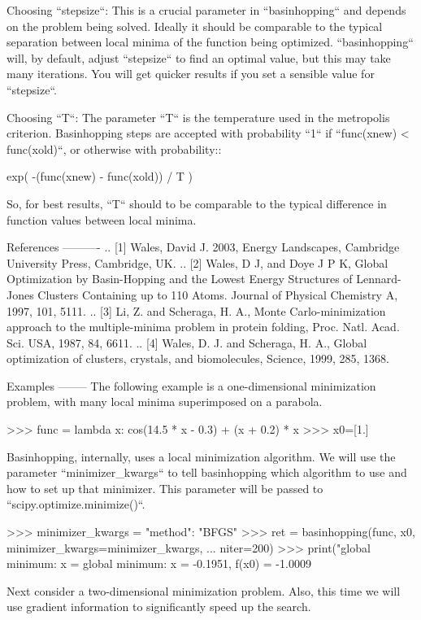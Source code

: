 \begin{DoxyVerb}
Choosing ``stepsize``:  This is a crucial parameter in ``basinhopping`` and
depends on the problem being solved.  Ideally it should be comparable to
the typical separation between local minima of the function being
optimized.  ``basinhopping`` will, by default, adjust ``stepsize`` to find
an optimal value, but this may take many iterations.  You will get quicker
results if you set a sensible value for ``stepsize``.

Choosing ``T``: The parameter ``T`` is the temperature used in the
metropolis criterion.  Basinhopping steps are accepted with probability
``1`` if ``func(xnew) < func(xold)``, or otherwise with probability::

    exp( -(func(xnew) - func(xold)) / T )

So, for best results, ``T`` should to be comparable to the typical
difference in function values between local minima.

References
----------
.. [1] Wales, David J. 2003, Energy Landscapes, Cambridge University Press,
    Cambridge, UK.
.. [2] Wales, D J, and Doye J P K, Global Optimization by Basin-Hopping and
    the Lowest Energy Structures of Lennard-Jones Clusters Containing up to
    110 Atoms.  Journal of Physical Chemistry A, 1997, 101, 5111.
.. [3] Li, Z. and Scheraga, H. A., Monte Carlo-minimization approach to the
    multiple-minima problem in protein folding, Proc. Natl. Acad. Sci. USA,
    1987, 84, 6611.
.. [4] Wales, D. J. and Scheraga, H. A., Global optimization of clusters,
    crystals, and biomolecules, Science, 1999, 285, 1368.

Examples
--------
The following example is a one-dimensional minimization problem,  with many
local minima superimposed on a parabola.

>>> func = lambda x: cos(14.5 * x - 0.3) + (x + 0.2) * x
>>> x0=[1.]

Basinhopping, internally, uses a local minimization algorithm.  We will use
the parameter ``minimizer_kwargs`` to tell basinhopping which algorithm to
use and how to set up that minimizer.  This parameter will be passed to
``scipy.optimize.minimize()``.

>>> minimizer_kwargs = {"method": "BFGS"}
>>> ret = basinhopping(func, x0, minimizer_kwargs=minimizer_kwargs,
...                    niter=200)
>>> print("global minimum: x = %
global minimum: x = -0.1951, f(x0) = -1.0009

Next consider a two-dimensional minimization problem. Also, this time we
will use gradient information to significantly speed up the search.


\end{DoxyVerb}
